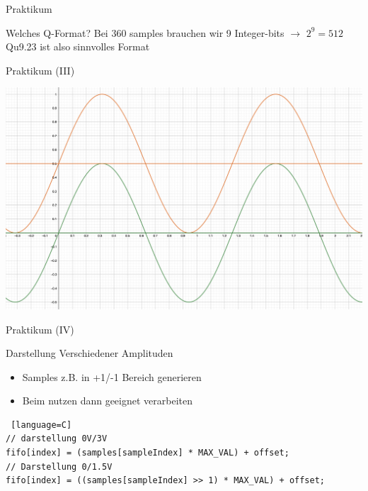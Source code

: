   \begin{frame} {Praktikum}
    \begin{block} {Welches Q-Format?}
      Bei 360 samples brauchen wir 9 Integer-bits $\rightarrow$ $2^9 = 512$ \\
      \vspace{0.5cm}
      Qu9.23 ist also sinnvolles Format
    \end{block}
  \end{frame}

  \begin{frame} {Praktikum (III)}
    \begin{center}
      \includegraphics[height = .8\textheight]{figs/sinus.png}
    \end{center}
  \end{frame}



  \begin{frame} [fragile] {Praktikum (IV)}
    \begin{block} {Darstellung Verschiedener Amplituden}  
      \begin{itemize}
          \item Samples z.B. in +1/-1 Bereich generieren
          \item Beim nutzen dann geeignet verarbeiten
      \end{itemize}
    \end{block}
    \begin{lstlisting} [language=C]
// darstellung 0V/3V
fifo[index] = (samples[sampleIndex] * MAX_VAL) + offset;
// Darstellung 0/1.5V
fifo[index] = ((samples[sampleIndex] >> 1) * MAX_VAL) + offset;
    \end{lstlisting}
  \end{frame}

